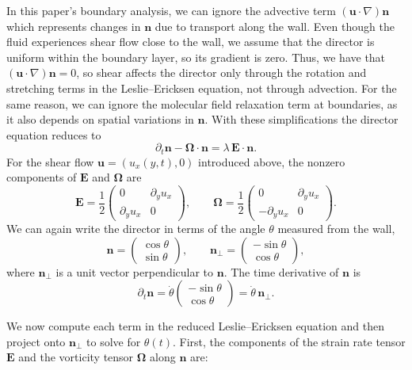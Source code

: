 \documentclass[11pt]{article}
\begin{document}
In this paper's boundary analysis, we can ignore the advective term $(\mathbf{u}\!\cdot\!\nabla)\mathbf{n}$ which represents changes in $\mathbf{n}$ due to transport along the wall. Even though the fluid experiences shear flow close to the wall, we assume that the director is uniform within the boundary layer, so its gradient is zero. Thus, we have that $(\mathbf{u}\!\cdot\!\nabla)\mathbf{n}=0$, so shear affects the director only through the rotation and stretching terms in the Leslie–Ericksen equation, not through advection. For the same reason, we can ignore the molecular field relaxation term at boundaries, as it also depends on spatial variations in $\mathbf{n}$. With these simplifications the director equation reduces to
\begin{equation}
\partial_t \mathbf{n} - \boldsymbol{\Omega}\!\cdot\!\mathbf{n}
= \lambda\,\mathbf{E}\!\cdot\!\mathbf{n}.
\end{equation}
For the shear flow $\mathbf{u}=(u_x(y,t),0)$ introduced above, the nonzero components of $\mathbf{E}$ and $\boldsymbol{\Omega}$ are
$$
\mathbf{E}
=\frac{1}{2}
\begin{pmatrix}
0 & \partial_y u_x\\[4pt]
\partial_y u_x & 0
\end{pmatrix},
\qquad
\boldsymbol{\Omega}
=\frac{1}{2}
\begin{pmatrix}
0 & \partial_y u_x\\[4pt]
-\partial_y u_x & 0
\end{pmatrix}.$$
We can again write the director in terms of the angle $\theta$ measured from the wall,
$$\mathbf{n} =
\begin{pmatrix}
\cos\theta\\[2pt]
\sin\theta
\end{pmatrix},
\qquad
\mathbf{n}_\perp =
\begin{pmatrix}
-\sin\theta\\[2pt]
\cos\theta
\end{pmatrix},$$
where $\mathbf{n}_\perp$ is a unit vector perpendicular to $\mathbf{n}$. The time derivative of $\mathbf{n}$ is
$$\partial_t \mathbf{n}
= \dot\theta
\begin{pmatrix}
-\sin\theta\\[2pt]
\cos\theta
\end{pmatrix}
= \dot\theta\,\mathbf{n}_\perp.$$

We now compute each term in the reduced Leslie–Ericksen equation and then project onto $\mathbf{n}_\perp$ to solve for $\theta(t)$. First, the components of the strain rate tensor $\mathbf{E}$ and the vorticity tensor $\mathbf{\Omega}$ along $\mathbf{n}$ are:
\end{document}
